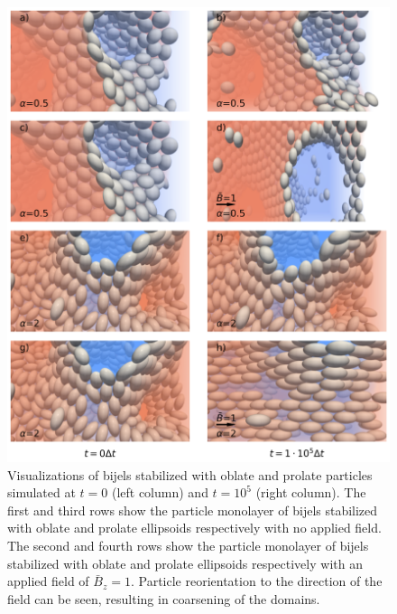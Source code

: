 \begin{figure} 
\centering 
\includegraphics[scale=0.2]{../figures/results/paper2/particle_viz-field_on.png} 
\caption{Visualizations of bijels stabilized with oblate and prolate particles simulated at $t = 0$ (left column) and $t = 10^5$ (right column). The first and 
         third rows show the particle monolayer of bijels stabilized with oblate and prolate ellipsoids respectively with no applied field. The second and fourth 
         rows show the particle monolayer of bijels stabilized with oblate and prolate ellipsoids respectively with an applied field of $\bar{B}_z = 1$. Particle 
         reorientation to the direction of the field can be seen, resulting in coarsening of the domains.} 
\label{fig:particle_viz-field_on} 
\end{figure}

